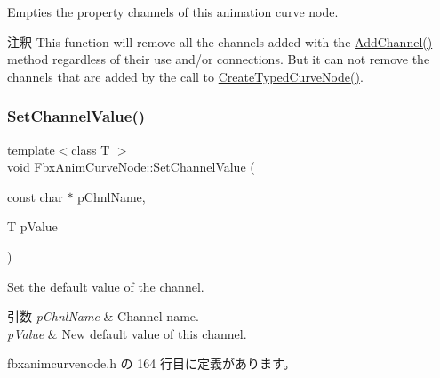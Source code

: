 Empties the property channels of this animation curve node. \begin{DoxyRemark}{注釈}
This function will remove all the channels added with the \hyperlink{class_fbx_anim_curve_node_a985772edb8c85825adfef69c6bd06627}{Add\+Channel()} method regardless of their use and/or connections. But it can not remove the channels that are added by the call to \hyperlink{class_fbx_anim_curve_node_a588814e5973e080f84c54438623ddf7e}{Create\+Typed\+Curve\+Node()}. 
\end{DoxyRemark}
\mbox{\label{class_fbx_anim_curve_node_a0efefd96f733f636d7aa95148be08726}} 
\subsubsection{\texorpdfstring{Set\+Channel\+Value()}{SetChannelValue()}\hspace{0.1cm}{\footnotesize\ttfamily [1/2]}}
{\footnotesize\ttfamily template$<$class T $>$ \\
void Fbx\+Anim\+Curve\+Node\+::\+Set\+Channel\+Value (\begin{DoxyParamCaption}\item[{const char $\ast$}]{p\+Chnl\+Name,  }\item[{T}]{p\+Value }\end{DoxyParamCaption})\hspace{0.3cm}{\ttfamily [inline]}}

Set the default value of the channel. 
\begin{DoxyParams}{引数}
{\em p\+Chnl\+Name} & Channel name. \\
\hline
{\em p\+Value} & New default value of this channel. \\
\hline
\end{DoxyParams}


 fbxanimcurvenode.\+h の 164 行目に定義があります。

\mbox{\label{class_fbx_anim_curve_node_aceef8634351d11d9058b5d023de5f5b4}} 

